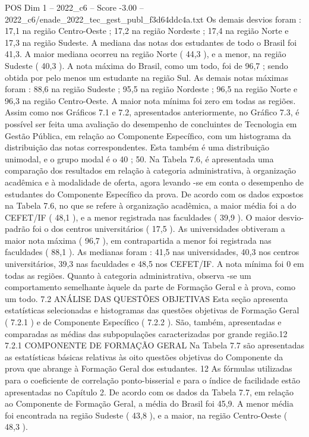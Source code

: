 \begin{textsample}{POS Dim 1 – 2022\_c6 – Score -3.00 – 2022\_c6/enade\_2022\_tec\_gest\_publ\_f3d64ddc4a.txt}
Os demais desvios foram : 17,1 na região Centro-Oeste ; 17,2 na região Nordeste ; 17,4 na região Norte e 17,3 na região Sudeste.
A mediana das notas dos estudantes de todo o Brasil foi 41,3.
A maior mediana ocorreu na região Norte ( 44,3 ), e a menor, na região Sudeste ( 40,3 ).
A nota máxima do Brasil, como um todo, foi de 96,7 ; sendo obtida por pelo menos um estudante na região Sul.
As demais notas máximas foram : 88,6 na região Sudeste ; 95,5 na região Nordeste ; 96,5 na região Norte e 96,3 na região Centro-Oeste.
A maior nota mínima foi zero em todas as regiões.
Assim como nos Gráficos 7.1 e 7.2, apresentados anteriormente, no Gráfico 7.3, é possível ser feita uma avaliação do desempenho de concluintes de Tecnologia em Gestão Pública, em relação ao Componente Específico, com um histograma da distribuição das notas correspondentes.
Esta também é uma distribuição unimodal, e o grupo modal é o 40 ; 50.
Na Tabela 7.6, é apresentada uma comparação dos resultados em relação à categoria administrativa, à organização acadêmica e à modalidade de oferta, agora levando -se em conta o desempenho de estudantes do Componente Específico da prova.
De acordo com os dados expostos na Tabela 7.6, no que se refere à organização acadêmica, a maior média foi a do CEFET/IF ( 48,1 ), e a menor registrada nas faculdades ( 39,9 ).
O maior desvio-padrão foi o dos centros universitários ( 17,5 ).
As universidades obtiveram a maior nota máxima ( 96,7 ), em contrapartida a menor foi registrada nas faculdades ( 88,1 ).
As medianas foram : 41,5 nas universidades, 40,3 nos centros universitários, 39,3 nas faculdades e 48,5 nos CEFET/IF.
A nota mínima foi 0 em todas as regiões.
Quanto à categoria administrativa, observa -se um comportamento semelhante àquele da parte de Formação Geral e à prova, como um todo. 7.2 ANÁLISE DAS QUESTÕES OBJETIVAS Esta seção apresenta estatísticas selecionadas e histogramas das questões objetivas de Formação Geral ( 7.2.1 ) e de Componente Específico ( 7.2.2 ).
São, também, apresentadas e comparadas as médias das subpopulações caracterizadas por grande região.12 7.2.1 COMPONENTE DE FORMAÇÃO GERAL Na Tabela 7.7 são apresentadas as estatísticas básicas relativas às oito questões objetivas do Componente da prova que abrange à Formação Geral dos estudantes. 12 As fórmulas utilizadas para o coeficiente de correlação ponto-bisserial e para o índice de facilidade estão apresentadas no Capítulo 2.
De acordo com os dados da Tabela 7.7, em relação ao Componente de Formação Geral, a média do Brasil foi 45,9.
A menor média foi encontrada na região Sudeste ( 43,8 ), e a maior, na região Centro-Oeste ( 48,3 ).

\end{textsample}
